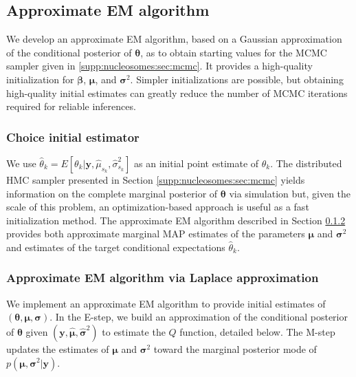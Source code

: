 \subsection{Approximate EM algorithm}
\label{supp:nucleosomes:sec:approxem}

We develop an approximate EM algorithm, based on a Gaussian approximation of the conditional posterior of $\bm \theta$, as to obtain starting values for the MCMC sampler given in \ref{supp:nucleosomes:sec:mcmc}.
It provides a high-quality initialization for $\bm \beta$, $\bm \mu$, and $\bm \sigma^2$.
Simpler initializations are possible, but obtaining high-quality initial estimates can greatly reduce the number of MCMC iterations required for reliable inferences.

\subsubsection{Choice initial estimator}
\label{supp:nucleosomes:sec:objective}

We use $\hat \theta_k = E \left[ \theta_k | \bm y, \hat \mu_{s_k}, \hat \sigma^2_{s_k} \right]$ as an initial point estimate of $\theta_k$.
The distributed HMC sampler presented in Section \ref{supp:nucleosomes:sec:mcmc} yields information on the complete marginal posterior of $\bm \theta$ via simulation but, given the scale of this problem, an optimization-based approach is useful as a fast initialization method.
The approximate EM algorithm described in Section \ref{supp:nucleosomes:sec:approximate_em} provides both approximate marginal MAP estimates of the parameters $\bm \mu$ and $\bm \sigma^2$ and estimates of the target conditional expectations $\hat \theta_k$.

\subsubsection{Approximate EM algorithm via Laplace approximation}
\label{supp:nucleosomes:sec:approximate_em}

We implement an approximate EM algorithm to provide initial estimates of $(\bm \theta, \bm \mu, \bm \sigma)$.
In the E-step, we build an approximation of the conditional posterior of ${\bm \theta}$ given $(\bm y, \hat {\bm\mu}, \hat{\bm\sigma}^2)$ to estimate the $Q$ function, detailed below.
The M-step updates the estimates of $\bm \mu$ and $\bm \sigma^2$ toward the marginal posterior mode of $p(\bm \mu, \bm \sigma^2 | \bm y)$.

